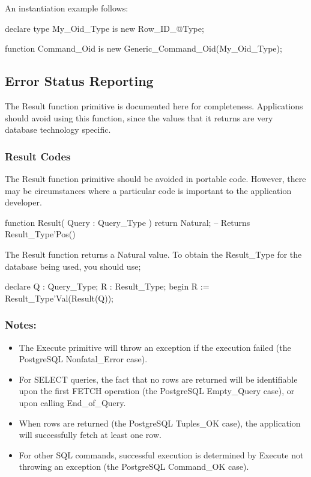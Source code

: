 \documentclass[english,letterpaper]{book}
\begin{document}
An instantiation example follows:

\begin{Example}
declare
   type My_Oid_Type is new Row_ID_@Type;

   function Command_Oid 
      is new Generic_Command_Oid(My_Oid_Type);
\end{Example}

\subsection{Error Status Reporting\label{Error Status Reporting}}

The Result function primitive is documented here for completeness.
Applications should avoid using this function, since the values that
it returns are very database technology specific.


\subsubsection{Result Codes}

The Result function primitive should be avoided in portable code. However,
there may be circumstances where a particular code is important to the
application developer.

\begin{Code}
function Result(
   Query : Query_Type
) return Natural;
  -- Returns Result_Type'Pos()
\end{Code}

The Result function returns a Natural value. To obtain the Result\_Type
for the database being used, you should use;

\begin{Example}
declare
   Q : Query_Type;
   R : Result_Type;
begin
   R := Result_Type'Val(Result(Q));
\end{Example}

\subsubsection{Notes:}

\begin{itemize}
   \item The Execute primitive will throw an exception if the execution failed
         (the PostgreSQL Nonfatal\_Error case).
   \item For SELECT queries, the fact that no rows are returned will be identifiable upon
         the first FETCH operation (the PostgreSQL Empty\_Query
         case), or upon calling End\_of\_Query.
   \item When rows are returned (the PostgreSQL Tuples\_OK case), the application will
         successfully fetch at least one row.
   \item For other SQL commands, successful execution is determined by Execute
         not throwing an exception (the PostgreSQL Command\_OK case). 
\end{itemize}
\end{document}
